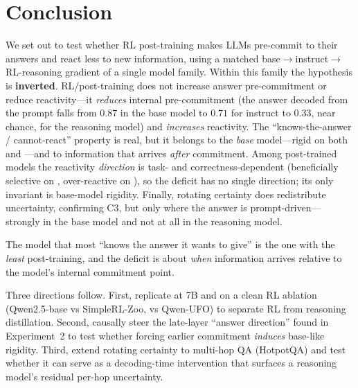 \section{Conclusion}
\label{sec:conclusion}

We set out to test whether RL post-training makes LLMs pre-commit to their answers and react
less to new information, using a matched base$\rightarrow$instruct$\rightarrow$RL-reasoning
gradient of a single model family. Within this family the hypothesis is \textbf{inverted}.
RL/post-training does not increase answer pre-commitment or reduce reactivity---it
\emph{reduces} internal pre-commitment (the answer decoded from the prompt falls from $0.87$
in the base model to $0.71$ for instruct to $0.33$, near chance, for the reasoning model) and
\emph{increases} reactivity. The ``knows-the-answer / cannot-react'' property is real, but it
belongs to the \emph{base} model---rigid on both \arc and \gsm---and to information that
arrives \emph{after} commitment. Among post-trained models the reactivity \emph{direction} is
task- and correctness-dependent (beneficially selective on \arc, over-reactive on \gsm), so
the deficit has no single direction; its only invariant is base-model rigidity. Finally,
rotating certainty does redistribute uncertainty, confirming C3, but only where the answer is
prompt-driven---strongly in the base model and not at all in the reasoning model.

 The model that most ``knows the answer it wants to give'' is the one with
the \emph{least} post-training, and the deficit is about \emph{when} information arrives
relative to the model's internal commitment point.

 Three directions follow. First, replicate at 7B and on a clean RL ablation
(\eg Qwen2.5-base vs SimpleRL-Zoo, vs Qwen-UFO) to separate RL from reasoning distillation.
Second, causally steer the late-layer ``answer direction'' found in Experiment~2 to test
whether forcing earlier commitment \emph{induces} base-like rigidity. Third, extend rotating
certainty to multi-hop QA (\eg HotpotQA) and test whether it can serve as a decoding-time
intervention that surfaces a reasoning model's residual per-hop uncertainty.
